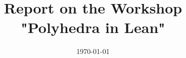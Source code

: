 \documentclass{article}
\begin{document}
\title{Report on the Workshop "Polyhedra in Lean"}

\date{\today}

\maketitle





\end{document}
